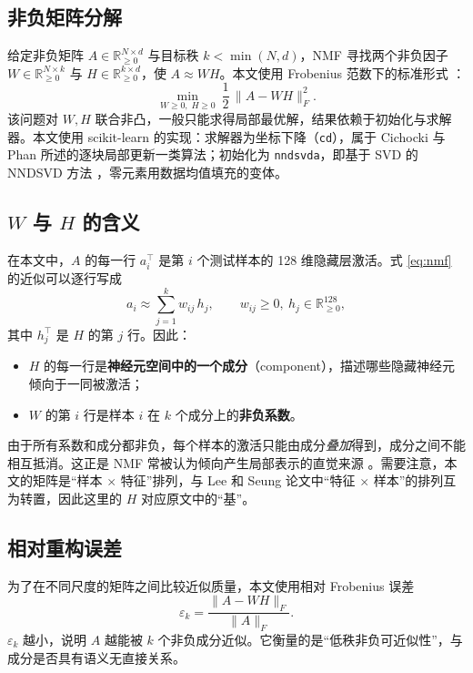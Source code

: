 \documentclass[UTF8,a4paper,11pt]{ctexart}
\newcommand{\code}[1]{\texttt{\small #1}}
\begin{document}
\subsection{非负矩阵分解}

给定非负矩阵 $A\in\mathbb{R}_{\ge0}^{N\times d}$ 与目标秩 $k<\min(N,d)$，NMF 寻找两个非负因子 $W\in\mathbb{R}_{\ge0}^{N\times k}$ 与 $H\in\mathbb{R}_{\ge0}^{k\times d}$，使 $A\approx WH$。本文使用 Frobenius 范数下的标准形式 \cite{lee2000algorithms}：
\begin{equation}
  \min_{W\ge0,\;H\ge0}\ \frac12\,\|A-WH\|_F^2 .
  \label{eq:nmf}
\end{equation}
该问题对 $W,H$ 联合非凸，一般只能求得局部最优解，结果依赖于初始化与求解器。本文使用 scikit-learn \cite{pedregosa2011sklearn} 的实现：求解器为坐标下降（\code{cd}），属于 Cichocki 与 Phan \cite{cichocki2009fast} 所述的逐块局部更新一类算法；初始化为 \code{nndsvda}，即基于 SVD 的 NNDSVD 方法 \cite{boutsidis2008svd}，零元素用数据均值填充的变体。

\subsection{$W$ 与 $H$ 的含义}

在本文中，$A$ 的每一行 $a_i^\top$ 是第 $i$ 个测试样本的 128 维隐藏层激活。式 \eqref{eq:nmf} 的近似可以逐行写成
\begin{equation}
  a_i \approx \sum_{j=1}^{k} w_{ij}\, h_j ,\qquad w_{ij}\ge0,\ h_j\in\mathbb{R}_{\ge0}^{128},
\end{equation}
其中 $h_j^\top$ 是 $H$ 的第 $j$ 行。因此：
\begin{itemize}
  \item $H$ 的每一行是\textbf{神经元空间中的一个成分}（component），描述哪些隐藏神经元倾向于一同被激活；
  \item $W$ 的第 $i$ 行是样本 $i$ 在 $k$ 个成分上的\textbf{非负系数}。
\end{itemize}
由于所有系数和成分都非负，每个样本的激活只能由成分\emph{叠加}得到，成分之间不能相互抵消。这正是 NMF 常被认为倾向产生局部表示的直觉来源 \cite{lee1999learning}。需要注意，本文的矩阵是“样本 $\times$ 特征”排列，与 Lee 和 Seung 论文中“特征 $\times$ 样本”的排列互为转置，因此这里的 $H$ 对应原文中的“基”。

\subsection{相对重构误差}

为了在不同尺度的矩阵之间比较近似质量，本文使用相对 Frobenius 误差
\begin{equation}
  \varepsilon_k=\frac{\|A-WH\|_F}{\|A\|_F}.
\end{equation}
$\varepsilon_k$ 越小，说明 $A$ 越能被 $k$ 个非负成分近似。它衡量的是“低秩非负可近似性”，与成分是否具有语义无直接关系。
\end{document}
